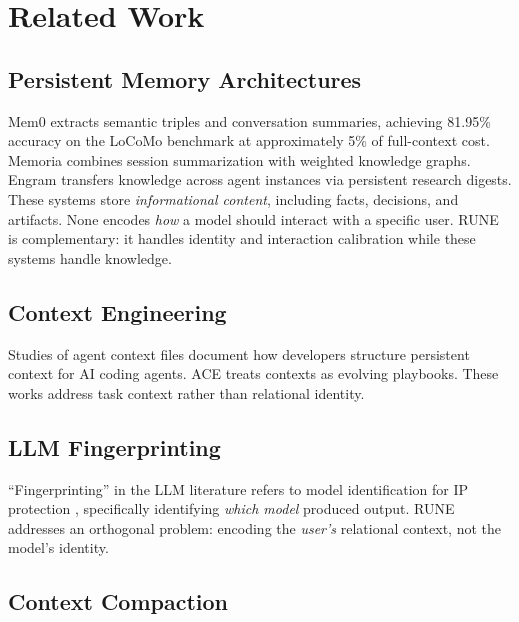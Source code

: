 \documentclass[11pt,a4paper]{article}
\begin{document}
\section{Related Work}

\subsection{Persistent Memory Architectures}

Mem0 \citep{mem02025} extracts semantic triples and conversation summaries, achieving 81.95\% accuracy on the LoCoMo benchmark at approximately 5\% of full-context cost. Memoria \citep{memoria2025} combines session summarization with weighted knowledge graphs. Engram \citep{engram2026} transfers knowledge across agent instances via persistent research digests. These systems store \textit{informational content}, including facts, decisions, and artifacts. None encodes \textit{how} a model should interact with a specific user. RUNE is complementary: it handles identity and interaction calibration while these systems handle knowledge.

\subsection{Context Engineering}

Studies of agent context files \citep{agentreadmes2025, codifiedcontext2026} document how developers structure persistent context for AI coding agents. ACE \citep{ace2026} treats contexts as evolving playbooks. These works address task context rather than relational identity.

\subsection{LLM Fingerprinting}

``Fingerprinting'' in the LLM literature refers to model identification for IP protection \citep{llmmap2024, scalable2025, editmf2025}, specifically identifying \textit{which model} produced output. RUNE addresses an orthogonal problem: encoding the \textit{user's} relational context, not the model's identity.

\subsection{Context Compaction}
\end{document}

